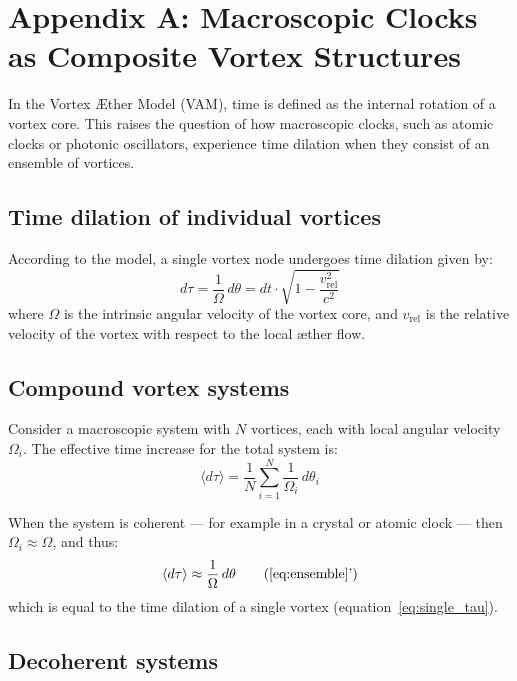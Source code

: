 \section*{Appendix A: Macroscopic Clocks as Composite Vortex Structures}
\label{appendix:ClocksInVortexStructures}

In the Vortex Æther Model (VAM), time is defined as the internal rotation of a vortex core. This raises the question of how macroscopic clocks, such as atomic clocks or photonic oscillators, experience time dilation when they consist of an ensemble of vortices.

\subsection*{Time dilation of individual vortices}

According to the model, a single vortex node undergoes time dilation given by:
\begin{equation}
d\tau = \frac{1}{\Omega} \, d\theta = dt \cdot \sqrt{1 - \frac{v_{\text{rel}}^2}{c^2}} \label{eq:single_tau}
\end{equation}
where \( \Omega \) is the intrinsic angular velocity of the vortex core, and \( v_{\text{rel}} \) is the relative velocity of the vortex with respect to the local æther flow.

\subsection*{Compound vortex systems}

Consider a macroscopic system with \( N \) vortices, each with local angular velocity \( \Omega_i \). The effective time increase for the total system is:
\begin{equation}
\langle d\tau \rangle = \frac{1}{N} \sum_{i=1}^{N} \frac{1}{\Omega_i} \, d\theta_i \label{eq:ensemble}
\end{equation}

When the system is coherent — for example in a crystal or atomic clock — then \( \Omega_i \approx \Omega \), and thus:
\begin{equation}
\langle d\tau \rangle \approx \frac{1}{\Omega} \, d\theta \tag{\ref{eq:ensemble}'}
\end{equation}
which is equal to the time dilation of a single vortex (equation~\ref{eq:single_tau}).

\subsection*{Decoherent systems}

